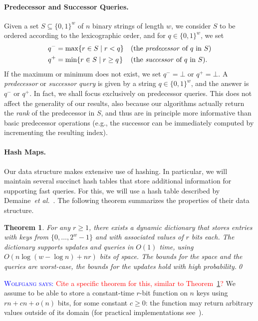\documentclass[a4paper,11pt]{article}
\newtheorem{theorem} {Theorem}[section]
\newcommand{\etal}{\emph{et al.}\xspace}
\newcommand{\?}{\mskip1.5mu}
\newcommand{\aremark}[3]{\textcolor{blue}{\textsc{#1 #2:}}
  \textcolor{red}{\textsf{#3}}}
\newcommand{\wolfgang}[2][says]{\aremark{Wolfgang}{#1}{#2}}
\begin{document}
\paragraph{Predecessor and Successor Queries.}
Given a set $S \subseteq \{0, 1\}^w$ of $n$ binary strings of 
length $w$, we consider $S$ to be ordered according to the 
lexicographic order, and for $q \in \{0, 1\}^w$, we set
\begin{align*}
     q^- &= \max \{r \in S \mid r < q\} && 
        \text{(the \emph{predecessor} of $q$ in $S$)} \\
     q^+ &= \min \{r \in S \mid r \geq q\?\} && 
       \text{(the \emph{successor} of $q$ in $S$)}.
\end{align*}
If the maximum or minimum does not exist, we set $q^- = \bot$ or 
$q^+ = \bot$.  A \emph{predecessor} or \emph{successor query} is
given by a string $q \in \{0, 1\}^w$, and the answer is $q^-$ or 
$q^+$. In fact, we shall focus exclusively on predecessor queries. 
This does not affect the generality of our results,
also because our algorithms actually return the \emph{rank} of the 
predecessor in $S$, and thus are in principle more informative 
than basic predecessor operations
(e.g., the successor can be immediately computed by incrementing 
the resulting index).

\paragraph{Hash Maps.}
Our data structure makes extensive use of
hashing. In particular, we will maintain several
succinct hash tables that store additional
information for supporting fast queries.
For this, we will use a hash table described
by Demaine~\etal~\cite{DemaineMePaPa06}.
The following theorem summarizes the properties
of their data structure.

\begin{theorem}\label{thm:succinct_retrieval_only_hashtable}
For any $r \geq 1$, there exists a dynamic dictionary that
stores entries with keys from $\{0, \dots, 2^w-1\}$ and with 
associated values of $r$ bits each.
The dictionary supports updates and queries in $O(1)$ time,
using $O(n \log(w - \log n) + nr)$ \emph{bits} of space.
The bounds for the space and the queries are
worst-case, the bounds for the updates hold with
high probability.\qed
\end{theorem}


\wolfgang{Cite a specific theorem for this, similar to 
  Theorem~\ref{thm:succinct_retrieval_only_hashtable}?}
We assume to be able to store a constant-time $r$-bit function on 
$n$ keys using $rn+cn +o(n)$ bits, for some constant $c\geq 0$: the 
function may return arbitrary values outside of its domain (for 
practical implementations see~\cite{BelazzouguiBoPaVi11}).
\end{document}
